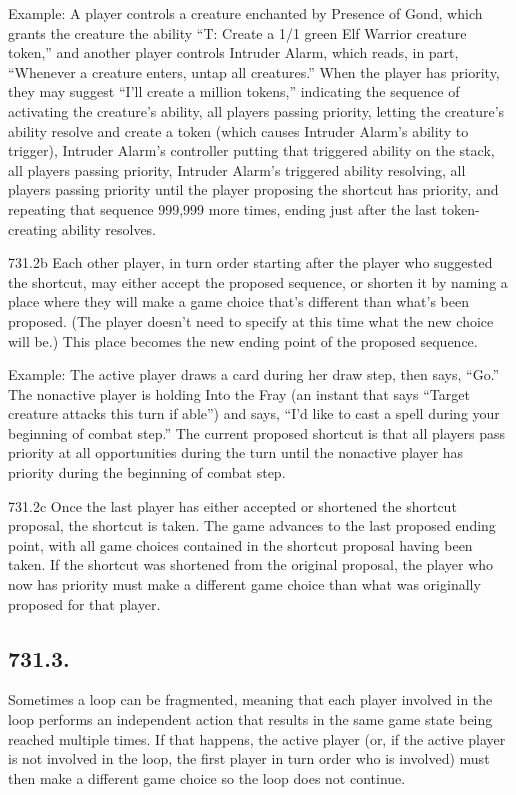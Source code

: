 Example: A player controls a creature enchanted by Presence of Gond, which grants the creature the ability “{T}: Create a 1/1 green Elf Warrior creature token,” and another player controls Intruder Alarm, which reads, in part, “Whenever a creature enters, untap all creatures.” When the player has priority, they may suggest “I’ll create a million tokens,” indicating the sequence of activating the creature’s ability, all players passing priority, letting the creature’s ability resolve and create a token (which causes Intruder Alarm’s ability to trigger), Intruder Alarm’s controller putting that triggered ability on the stack, all players passing priority, Intruder Alarm’s triggered ability resolving, all players passing priority until the player proposing the shortcut has priority, and repeating that sequence 999,999 more times, ending just after the last token-creating ability resolves.

731.2b Each other player, in turn order starting after the player who suggested the shortcut, may either accept the proposed sequence, or shorten it by naming a place where they will make a game choice that’s different than what’s been proposed. (The player doesn’t need to specify at this time what the new choice will be.) This place becomes the new ending point of the proposed sequence.

Example: The active player draws a card during her draw step, then says, “Go.” The nonactive player is holding Into the Fray (an instant that says “Target creature attacks this turn if able”) and says, “I’d like to cast a spell during your beginning of combat step.” The current proposed shortcut is that all players pass priority at all opportunities during the turn until the nonactive player has priority during the beginning of combat step.

731.2c Once the last player has either accepted or shortened the shortcut proposal, the shortcut is taken. The game advances to the last proposed ending point, with all game choices contained in the shortcut proposal having been taken. If the shortcut was shortened from the original proposal, the player who now has priority must make a different game choice than what was originally proposed for that player.

\subsection*{731.3.}
Sometimes a loop can be fragmented, meaning that each player involved in the loop performs an independent action that results in the same game state being reached multiple times. If that happens, the active player (or, if the active player is not involved in the loop, the first player in turn order who is involved) must then make a different game choice so the loop does not continue.


